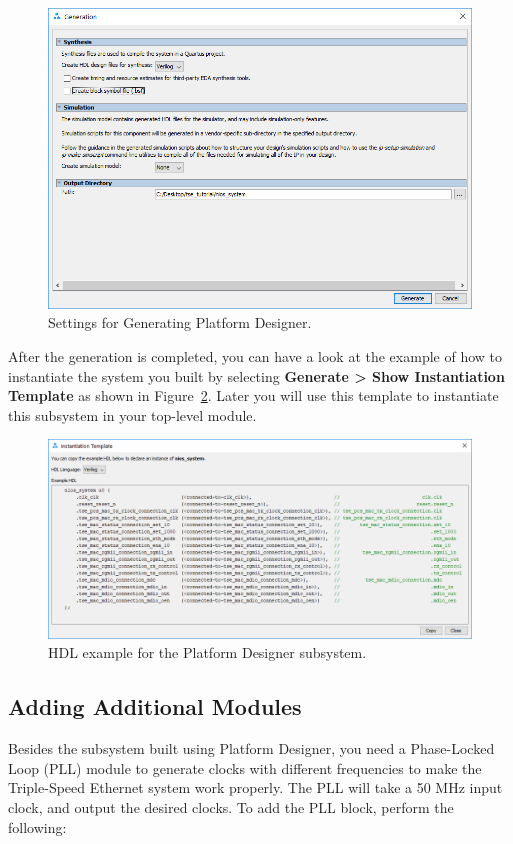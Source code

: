 \documentclass[11pt, twoside, pdftex]{article}
\begin{document}
\begin{enumerate}
		\begin{figure}[H]
			\centering
			  \includegraphics[scale=0.55]{figures/qsys_generation.png}
			\caption{Settings for Generating Platform Designer.} 
			\label{fig:qsys_generation}
		\end{figure}	
\end{enumerate}

After the generation is completed, you can have a look at the example of how to instantiate the system you built by selecting {\bf Generate > Show Instantiation Template} as shown in Figure~\ref{fig:hdl_example}. Later you will use this template to instantiate this subsystem in your top-level module. 

		\begin{figure}[H]
			\centering
			  \includegraphics[scale=0.5]{figures/hdl_example.png}
			\caption{HDL example for the Platform Designer subsystem.} 
			\label{fig:hdl_example}
		\end{figure}

\subsection{Adding Additional Modules}
Besides the subsystem built using Platform Designer, you need a Phase-Locked Loop (PLL) module to generate clocks with different frequencies to make the Triple-Speed Ethernet system work properly. The PLL will take a 50 MHz input clock, and output the desired clocks. To add the PLL block, perform the following:
\end{document}
